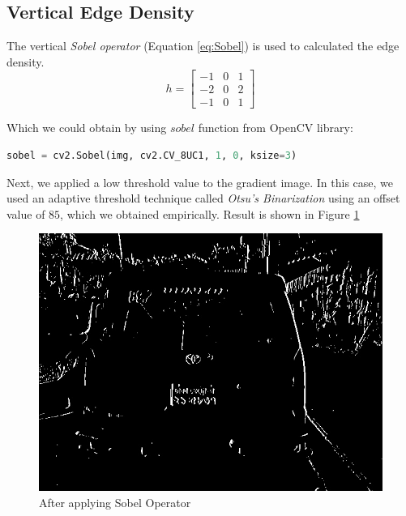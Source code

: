 \documentclass{standalone}
\begin{document}
\subsection{Vertical Edge Density}
The vertical {\it Sobel operator} (Equation \ref{eq:Sobel}) is used to calculated the edge density. 
\begin{equation} \label{eq:Sobel}
h =
  \begin{bmatrix}
    -1 & 0 & 1\\
    -2 & 0 & 2\\
    -1 & 0 & 1
  \end{bmatrix} 
\end{equation}

Which we could obtain by using $sobel$ function from OpenCV library:
\begin{lstlisting}[language=Python]
sobel = cv2.Sobel(img, cv2.CV_8UC1, 1, 0, ksize=3)
\end{lstlisting}

Next, we applied a low threshold value to the gradient image. In this case, we used an adaptive threshold technique called {\it Otsu’s Binarization} using an offset value of $85$, which we obtained empirically. Result is shown in Figure \ref{fig:SobelSample}
\begin{figure}
	\centering
	\includegraphics[width=.8\linewidth]{./img/sample/stage2.jpg}
	\caption{After applying Sobel Operator} 
	\label{fig:SobelSample}
\end{figure}
\end{document}
